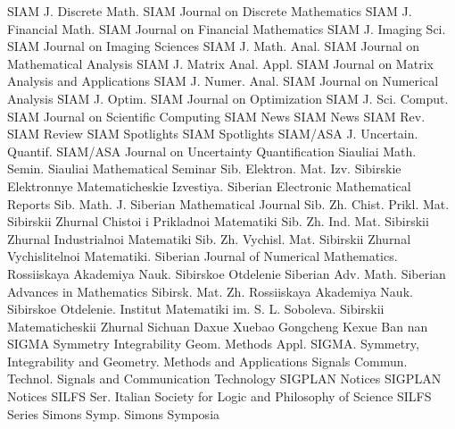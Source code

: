 {SIAM J. Discrete Math.}
{SIAM Journal on Discrete Mathematics}
{SIAM J. Financial Math.}
{SIAM Journal on Financial Mathematics}
{SIAM J. Imaging Sci.}
{SIAM Journal on Imaging Sciences}
{SIAM J. Math. Anal.}
{SIAM Journal on Mathematical Analysis}
{SIAM J. Matrix Anal. Appl.}
{SIAM Journal on Matrix Analysis and Applications}
{SIAM J. Numer. Anal.}
{SIAM Journal on Numerical Analysis}
{SIAM J. Optim.}
{SIAM Journal on Optimization}
{SIAM J. Sci. Comput.}
{SIAM Journal on Scientific Computing}
{SIAM News}
{SIAM News}
{SIAM Rev.}
{SIAM Review}
{SIAM Spotlights}
{SIAM Spotlights}
{SIAM/ASA J. Uncertain. Quantif.}
{SIAM/ASA Journal on Uncertainty Quantification}
{Siauliai Math. Semin.}
{Siauliai Mathematical Seminar}
{Sib. Elektron. Mat. Izv.}
{Sibirskie Elektronnye Matematicheskie Izvestiya. Siberian Electronic Mathematical Reports}
{Sib. Math. J.}
{Siberian Mathematical Journal}
{Sib. Zh. Chist. Prikl. Mat.}
{Sibirskii Zhurnal Chistoi i Prikladnoi Matematiki}
{Sib. Zh. Ind. Mat.}
{Sibirskii Zhurnal Industrialnoi Matematiki}
{Sib. Zh. Vychisl. Mat.}
{Sibirskii Zhurnal Vychislitelnoi Matematiki. Siberian Journal of Numerical Mathematics. Rossiiskaya Akademiya Nauk. Sibirskoe Otdelenie}
{Siberian Adv. Math.}
{Siberian Advances in Mathematics}
{Sibirsk. Mat. Zh.}
{Rossiiskaya Akademiya Nauk. Sibirskoe Otdelenie. Institut Matematiki im. S. L. Soboleva. Sibirskii Matematicheskii Zhurnal}
{Sichuan Daxue Xuebao Gongcheng Kexue Ban}
{nan}
{SIGMA Symmetry Integrability Geom. Methods Appl.}
{SIGMA. Symmetry, Integrability and Geometry. Methods and Applications}
{Signals Commun. Technol.}
{Signals and Communication Technology}
{SIGPLAN Notices}
{SIGPLAN Notices}
{SILFS Ser.}
{Italian Society for Logic and Philosophy of Science SILFS Series}
{Simons Symp.}
{Simons Symposia}
